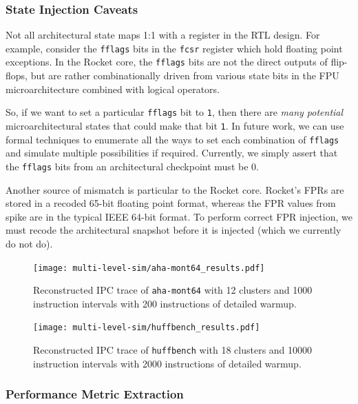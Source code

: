 \documentclass[sigplan,nonacm,10pt]{acmart}
\begin{document}
\subsubsection{State Injection Caveats}

Not all architectural state maps 1:1 with a register in the RTL design.
For example, consider the \texttt{fflags} bits in the \texttt{fcsr} register which hold floating point exceptions.
In the Rocket core, the \texttt{fflags} bits are not the direct outputs of flip-flops, but are rather combinationally driven from various state bits in the FPU microarchitecture combined with logical operators.

So, if we want to set a particular \texttt{fflags} bit to \texttt{1}, then there are \textit{many potential} microarchitectural states that could make that bit \texttt{1}.
In future work, we can use formal techniques to enumerate all the ways to set each combination of \texttt{fflags} and simulate multiple possibilities if required.
Currently, we simply assert that the \texttt{fflags} bits from an architectural checkpoint must be 0.

Another source of mismatch is particular to the Rocket core.
Rocket's FPRs are stored in a recoded 65-bit floating point format, whereas the FPR values from spike are in the typical IEEE 64-bit format.
To perform correct FPR injection, we must recode the architectural snapshot before it is injected (which we currently do not do).

\begin{figure}
  \texttt{[image: multi-level-sim/aha-mont64\_results.pdf]}
  \caption{Reconstructed IPC trace of \texttt{aha-mont64} with 12 clusters and 1000 instruction intervals with 200 instructions of detailed warmup.}
  \label{fig:ipc_trace_reconstruction_aha}
\end{figure}

\begin{figure}
  \texttt{[image: multi-level-sim/huffbench\_results.pdf]}
  \caption{Reconstructed IPC trace of \texttt{huffbench} with 18 clusters and 10000 instruction intervals with 2000 instructions of detailed warmup.}
  \label{fig:ipc_trace_reconstruction_huffbench}
\end{figure}

\subsubsection{Performance Metric Extraction}
\end{document}
